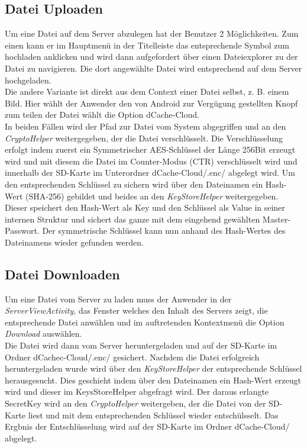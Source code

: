 \documentclass[10pt, a4paper]{scrreprt}
\begin{document}
\subsection{Datei Uploaden}
Um eine Datei auf dem Server abzulegen hat der Benutzer 2 Möglichkeiten. Zum einen kann er im Hauptmenü in der Titelleiste das entsprechende Symbol zum hochladen anklicken und wird dann aufgefordert über einen Dateiexplorer zu der Datei zu navigieren. Die dort angewählte Datei wird entsprechend auf dem Server hochgeladen. \\
Die andere Variante ist direkt aus dem Context einer Datei selbst, z. B. einem Bild. Hier wählt der Anwender den von Android zur Vergügung gestellten Knopf zum teilen der Datei wählt die Option dCache-Cloud. \\
In beiden Fällen wird der Pfad zur Datei vom System abgegriffen und an den \textit{CryptoHelper} weitergegeben, der die Datei  verschlüsselt. Die Verschlüsselung erfolgt indem zuerst ein Symmetrischer AES-Schlüssel der Länge 256Bit erzeugt wird und mit diesem die Datei im Counter-Modus (CTR) verschlüsselt wird und innerhalb der SD-Karte im Unterordner dCache-Cloud/.enc/ abgelegt wird. Um den entsprechenden Schlüssel zu sichern wird über den Dateinamen ein Hash-Wert (SHA-256) gebildet und beides an den \textit{KeyStoreHelper} weitergegeben. Dieser speichert den  Hash-Wert als Key und den Schlüssel als Value in seiner internen Struktur und sichert das ganze mit dem eingehend gewählten Master-Passwort. Der symmetrische Schlüssel kann nun anhand des Hash-Wertes des Dateinamens wieder gefunden werden.


\subsection{Datei Downloaden}
Um eine Datei vom Server zu laden muss der Anwender in der \textit{ServerViewActivity}, das Fenster welches den Inhalt des Servers zeigt, die entsprechende Datei anwählen und im auftretenden Kontextmenü die Option \textit{Download} auswählen.  \\
Die Datei wird dann vom Server heruntergeladen und auf der SD-Karte im Ordner dCachec-Cloud/.enc/ gesichert. Nachdem die Datei erfolgreich heruntergeladen wurde wird über den \textit{KeyStoreHelper} der entsprechende Schlüssel herausgesucht. Dies geschieht indem über den Dateinamen ein Hash-Wert erzeugt wird und dieser im KeysStoreHelper abgefragt wird. Der daraus erlangte SecretKey wird an den \textit{CryptoHelper} weitergeben, der die Datei von der SD-Karte liest und mit dem entsprechenden Schlüssel wieder entschülsselt. Das Ergbnis der Entschlüsselung wird auf der SD-Karte im Ordner dCache-Cloud/ abgelegt.
\end{document}
